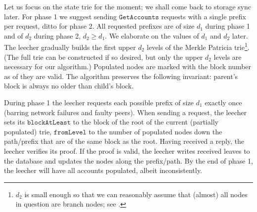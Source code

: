 \documentclass{amsart}
\begin{document}
Let us focus on the state trie for the moment; we shall come back to storage sync later.
For phase 1 we suggest sending $\texttt{GetAccounts}$ requests with a single prefix per request, ditto for phase 2.
All requested prefixes are of size $d_1$ during phase 1 and of $d_2$ during phase 2, $d_2 \geq d_1$.
We elaborate on the values of $d_1$ and $d_2$ later.
The leecher gradually builds the first upper $d_2$ levels of the Merkle Patricia trie\footnote{$d_2$
is small enough so that we can reasonably assume that (almost) all nodes in question are branch nodes;
see \cite{akhunov_1x_workshop_part2}.}.
(The full trie can be constructed if so desired, but only the upper $d_2$ levels are necessary for our algorithm.)
Populated nodes are marked with the block number as of they are valid.
The algorithm preserves the following invariant: parent's block is always no older than child's block.

During phase 1 the leecher requests each possible prefix of size $d_1$ exactly once
(barring network failures and faulty peers).
When sending a request,
the leecher sets its $\texttt{blockAtLeast}$ to the block of the root of the current (partially populated) trie,
$\texttt{fromLevel}$ to the number of populated nodes down the path/prefix that are of the same block as the root.
Having received a reply, the leecher verifies its proof.
If the proof is valid, the leecher writes received leaves to the database and updates the nodes along the prefix/path.
By the end of phase 1, the leecher will have all accounts populated, albeit inconsistently.
\end{document}
